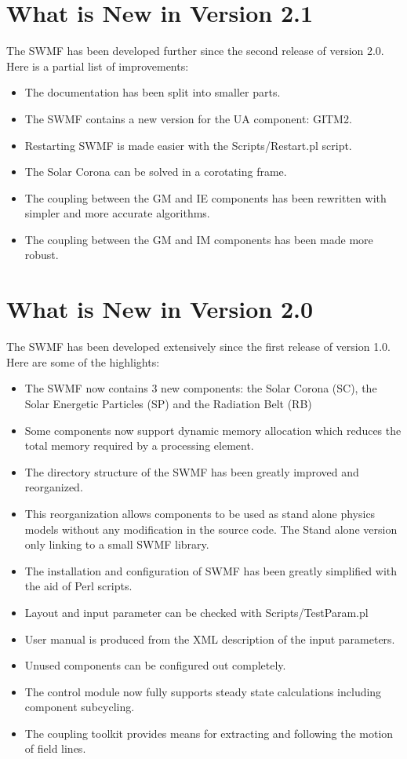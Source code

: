\section{What is New in Version 2.1}

The SWMF has been developed further since the second release of
version 2.0. Here is a partial list of improvements:
\begin{itemize}
\item The documentation has been split into smaller parts.
\item The SWMF contains a new version for the UA component: GITM2.
\item Restarting SWMF is made easier with the Scripts/Restart.pl script.
\item The Solar Corona can be solved in a corotating frame.
\item The coupling between the GM and IE components has been rewritten
      with simpler and more accurate algorithms.
\item The coupling between the GM and IM components has been made more robust.
\end{itemize}

\section{What is New in Version 2.0}

The SWMF has been developed extensively since the first release of
version 1.0. Here are some of the highlights:
\begin{itemize}
\item The SWMF now contains 3 new components:
      the Solar Corona (SC), the Solar Energetic Particles (SP) 
      and the Radiation Belt (RB)
\item Some components now support dynamic memory allocation which 
      reduces the total memory required by a processing element. 
\item The directory structure of the SWMF has been greatly improved and 
      reorganized. 
\item This reorganization allows components to be used as stand alone 
      physics models without any modification in the source code.  The
      Stand alone version only linking to a small SWMF library.
\item The installation and configuration of SWMF has been greatly simplified
      with the aid of Perl scripts. 
\item Layout and input parameter can be checked with Scripts/TestParam.pl
\item User manual is produced from the XML description of the input parameters.
\item Unused components can be configured out completely.
\item The control module now fully supports steady state calculations 
      including component subcycling. 
\item The coupling toolkit provides means for extracting and following 
      the motion of field lines.
\end{itemize}

